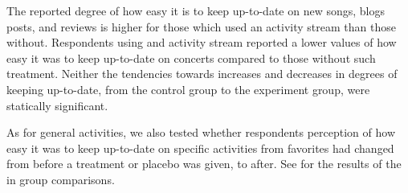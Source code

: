 The reported degree of how easy it is to keep up-to-date
on new songs, blogs posts, and reviews is higher for those
which used an activity stream than those without. Respondents using
and activity stream reported a lower values of how easy it was
to keep up-to-date on concerts compared to those without such treatment.
Neither the tendencies towards increases and decreases in degrees of keeping
up-to-date, from the
control group to the experiment group, were statically significant.

As for general activities, we also tested whether respondents perception
of how easy it was to keep up-to-date on specific activities from
favorites had changed from before a treatment or placebo was given, to after.
See 
 for the results of the
in group comparisons.

